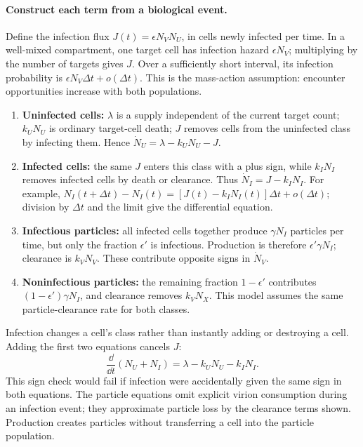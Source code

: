 \paragraph{Construct each term from a biological event.}
Define the infection flux $J(t)=\epsilon N_VN_U$, in cells newly infected per time. In a well-mixed compartment, one target cell has infection hazard $\epsilon N_V$; multiplying by the number of targets gives $J$. Over a sufficiently short interval, its infection probability is $\epsilon N_V\Delta t+o(\Delta t)$. This is the mass-action assumption: encounter opportunities increase with both populations.
\begin{enumerate}
\item \textbf{Uninfected cells:} $\lambda$ is a supply independent of the current target count; $k_UN_U$ is ordinary target-cell death; $J$ removes cells from the uninfected class by infecting them. Hence $\dot N_U=\lambda-k_UN_U-J$.
\item \textbf{Infected cells:} the same $J$ enters this class with a plus sign, while $k_IN_I$ removes infected cells by death or clearance. Thus $\dot N_I=J-k_IN_I$. For example, $N_I(t+\Delta t)-N_I(t)=[J(t)-k_IN_I(t)]\Delta t+o(\Delta t)$; division by $\Delta t$ and the limit give the differential equation.
\item \textbf{Infectious particles:} all infected cells together produce $\gamma N_I$ particles per time, but only the fraction $\epsilon'$ is infectious. Production is therefore $\epsilon'\gamma N_I$; clearance is $k_VN_V$. These contribute opposite signs in $\dot N_V$.
\item \textbf{Noninfectious particles:} the remaining fraction $1-\epsilon'$ contributes $(1-\epsilon')\gamma N_I$, and clearance removes $k_VN_X$. This model assumes the same particle-clearance rate for both classes.
\end{enumerate}
Infection changes a cell's class rather than instantly adding or destroying a cell. Adding the first two equations cancels $J$:
\begin{equation}\label{eq:lec02:total-cell-balance}
\frac{\dd}{\dd t}(N_U+N_I)=\lambda-k_UN_U-k_IN_I.
\end{equation}
This sign check would fail if infection were accidentally given the same sign in both equations. The particle equations omit explicit virion consumption during an infection event; they approximate particle loss by the clearance terms shown. Production creates particles without transferring a cell into the particle population.

